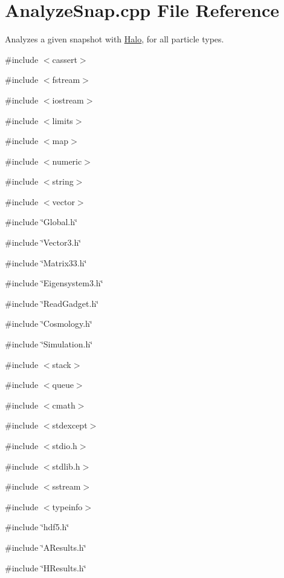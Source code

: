 \section{AnalyzeSnap.cpp File Reference}
\label{AnalyzeSnap_8cpp}


Analyzes a given snapshot with \hyperlink{classHalo}{Halo}, for all particle types.  


{\ttfamily \#include $<$cassert$>$}\par
{\ttfamily \#include $<$fstream$>$}\par
{\ttfamily \#include $<$iostream$>$}\par
{\ttfamily \#include $<$limits$>$}\par
{\ttfamily \#include $<$map$>$}\par
{\ttfamily \#include $<$numeric$>$}\par
{\ttfamily \#include $<$string$>$}\par
{\ttfamily \#include $<$vector$>$}\par
{\ttfamily \#include \char`\"{}Global.h\char`\"{}}\par
{\ttfamily \#include \char`\"{}Vector3.h\char`\"{}}\par
{\ttfamily \#include \char`\"{}Matrix33.h\char`\"{}}\par
{\ttfamily \#include \char`\"{}Eigensystem3.h\char`\"{}}\par
{\ttfamily \#include \char`\"{}ReadGadget.h\char`\"{}}\par
{\ttfamily \#include \char`\"{}Cosmology.h\char`\"{}}\par
{\ttfamily \#include \char`\"{}Simulation.h\char`\"{}}\par
{\ttfamily \#include $<$stack$>$}\par
{\ttfamily \#include $<$queue$>$}\par
{\ttfamily \#include $<$cmath$>$}\par
{\ttfamily \#include $<$stdexcept$>$}\par
{\ttfamily \#include $<$stdio.h$>$}\par
{\ttfamily \#include $<$stdlib.h$>$}\par
{\ttfamily \#include $<$sstream$>$}\par
{\ttfamily \#include $<$typeinfo$>$}\par
{\ttfamily \#include \char`\"{}hdf5.h\char`\"{}}\par
{\ttfamily \#include \char`\"{}AResults.h\char`\"{}}\par
{\ttfamily \#include \char`\"{}HResults.h\char`\"{}}\par
